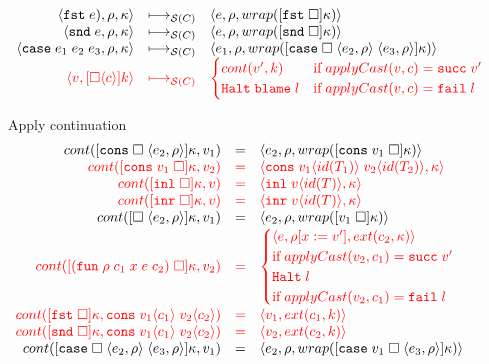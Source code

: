 \documentclass[acmsmall,review,anonymous]{acmart}\settopmatter{printfolios=true,printccs=false,printacmref=false}
\newcommand{\funrule}[3]{#1 &=& #2 & #3\\}
\newcommand{\hifunrule}[3]{\highlight{#1} &\highlight{=}& \highlight{#2} & 
\highlight{#3}\\}
\newcommand{\sOOinspect}[3]{\langle#1,#2,#3\rangle}
\newcommand{\sOOreturn}[2]{\langle#1,#2\rangle}
\newcommand{\sOOhalt}[1]{\mathtt{Halt} \; #1}
\newcommand{\eOOcar}[1]{\mathtt{fst} \; #1}
\newcommand{\eOOcdr}[1]{\mathtt{snd} \; #1}
\newcommand{\eOOcase}[3]{\mathtt{case} \; #1 \; #2 \; #3}
\newcommand{\oOOblame}[1]{\mathtt{blame} \; #1}
\newcommand{\rOOsucc}[1]{\mathtt{succ}\;#1}
\newcommand{\rOOfail}[1]{\mathtt{fail}\;#1}
\newcommand{\kOOconsI}[3]{[\mathtt{cons} \; \square \; \langle#1,#2\rangle ]#3}
\newcommand{\kOOconsII}[2]{[\mathtt{cons} \; #1 \; \square]#2}
\newcommand{\kOOinl}[1]{[\mathtt{inl}\; \square]#1}
\newcommand{\kOOinr}[1]{[\mathtt{inr}\; \square]#1}
\newcommand{\kOOappI}[3]{
  [\square \; \langle#1,#2\rangle]#3
}
\newcommand{\kOOappII}[2]{
  [#1 \; \square]#2}
\newcommand{\kOOcar}[1]{[\mathtt{fst} \; \square]#1}
\newcommand{\kOOcdr}[1]{[\mathtt{snd} \; \square]#1}
\newcommand{\kOOcaseI}[4]{
  [\mathtt{case} \; \square \; \langle#1,#3\rangle \; \langle#2,#3\rangle ]#4}
\newcommand{\kOOcaseII}[4]{
  [\mathtt{case} \; #1 \; \square \; \langle#2,#3\rangle ]#4}
\newcommand{\kOOcast}[2]{
  [\square \langle #1 \rangle]#2}
\newcommand{\hcvOOfun}[5]{\mathtt{fun} \; #2 \; #1 \; #3 \; #4 \; #5}
\newcommand{\hcvOOcons}[4]{\mathtt{cons}\;#1\langle#2\rangle\;#3\langle#4\rangle}
\newcommand{\hcvOOinl}[2]{\mathtt{inl}\;#1\langle#2\rangle}
\newcommand{\hcvOOinr}[2]{\mathtt{inr}\;#1\langle#2\rangle}
\newcommand{\sidecond}[1]{\text{if}\;#1}
\newcommand{\redruleS}[3]{#1 & \longmapsto_{\mathcal{S}(C)} & #2 & #3\\}
\newcommand{\hiredruleS}[3]{\highlight{#1} & 
\highlight{\longmapsto_{\mathcal{S}(C)}} & \highlight{#2} & \highlight{#3} \\}
\newcommand{\continue}[2]{cont(#2,#1)}
\newcommand{\highlight}[1]{{\color{red} #1}}
\begin{document}
\begin{figure}
\[\begin{array}{rclr}
  \redruleS{
    \sOOinspect{\eOOcar{e})}{\rho}{\kappa}}{
    \sOOinspect{e}{\rho}{wrap(\kOOcar{\kappa})}}{}
  
  \redruleS{
    \sOOinspect{\eOOcdr{e}}{\rho}{\kappa}}{
    \sOOinspect{e}{\rho}{wrap(\kOOcdr{\kappa})}}{}
  
  \redruleS{
    \sOOinspect{\eOOcase{e_1}{e_2}{e_3}}{\rho}{\kappa}}{
    \sOOinspect{e_1}{\rho}{wrap(\kOOcaseI{e_2}{e_3}{\rho}{\kappa})}}{}
  \hiredruleS{
    \sOOreturn{v}{\kOOcast{c}{k}}
  }{
  \begin{cases}
  \continue{k}{v'} & \sidecond{applyCast(v,c) = \rOOsucc{v'}} 
  \\
  \sOOhalt{\oOOblame{l}} & \sidecond{applyCast(v,c) = \rOOfail{l}}
  \end{cases}
  }{}
  \end{array}
  \]
  
  Apply continuation
  \fbox{$\continue{k}{v} = s$}
  \[
  \begin{array}{rclr}
  

\funrule{
  \continue{v_1}{\kOOconsI{e_2}{\rho}{\kappa}}}{
  \sOOinspect{e_2}{\rho}{wrap(\kOOconsII{v_1}{\kappa})}}{}

\hifunrule{
  \continue{v_2}{\kOOconsII{v_1}{\kappa}}}{
  \sOOreturn{\hcvOOcons{v_1}{id(T_1)}{v_2}{id(T_2)}}{\kappa}}{}

\hifunrule{
  \continue{v}{\kOOinl{\kappa}}}{
  \sOOreturn{\hcvOOinl{v}{id(T)}}{\kappa}}{}

\hifunrule{
  \continue{v}{\kOOinr{\kappa}}}{
  \sOOreturn{\hcvOOinr{v}{id(T)}}{\kappa}}{}

\funrule{
  \continue{v_1}{\kOOappI{e_2}{\rho}{\kappa}}}{
  \sOOinspect{e_2}{\rho}{
    wrap(\kOOappII{v_1}{\kappa})
  }}{}

\hifunrule{
  \continue{v_2}{\kOOappII{(\hcvOOfun{c_1}{\rho}{x}{e}{c_2})}{\kappa}}}{
\begin{cases}
\sOOinspect{e}{\rho[x:=v']}{ext(c_2,\kappa)} \\
\sidecond{applyCast(v_2,c_1) = \rOOsucc{v'}}
\\
\sOOhalt{l} \\
\sidecond{applyCast(v_2,c_1) = \rOOfail{l}}
\end{cases}
}{}


\hifunrule{
  \continue{\hcvOOcons{v_1}{c_1}{v_2}{c_2}}{
    \kOOcar{\kappa}
  }
}{
  \sOOreturn{v_1}{ext(c_1,k)}
}{}
\hifunrule{
  \continue{\hcvOOcons{v_1}{c_1}{v_2}{c_2}}{
    \kOOcdr{\kappa}
  }
}{
  \sOOreturn{v_2}{ext(c_2,k)}
}{}

\funrule{
  \continue{v_1}{\kOOcaseI{e_2}{e_3}{\rho}{\kappa}}
}{
  \sOOinspect{e_2}{\rho}{
    wrap(\kOOcaseII{v_1}{e_3}{\rho}{\kappa})
  }
}{}


\end{array}\]
\end{figure}
\end{document}
